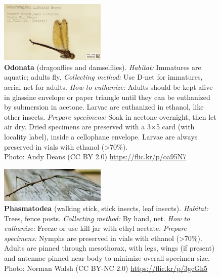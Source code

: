 \documentclass[letterpaper, 11pt]{article}
\begin{document}
\clearpage

\begin{figure}
  \caption{\textbf{Odonata} (dragonflies and damselflies). \textit{Habitat:} Immatures are aquatic; adults fly. \textit{Collecting method:} Use D-net for immatures, aerial net for adults. \textit{How to euthanize:} Adults should be kept alive in glassine envelope or paper triangle until they can be euthanized by submersion in acetone. Larvae are euthanized in ethanol, like other insects. \textit{Prepare specimens:} Soak in acetone overnight, then let air dry. Dried specimens are preserved with a 3$\times$5 card (with locality label), inside a cellophane envelope. Larvae are always preserved in vials with ethanol (\textgreater70\%).\\ Photo: Andy Deans (CC BY 2.0) \url{https://flic.kr/p/oa95N7}}
  \includegraphics[width=0.45\textwidth]{Odonata}
\end{figure}

\begin{figure}
  \caption{\textbf{Phasmatodea} (walking stick, stick insects, leaf insects). \textit{Habitat:} Trees, fence posts. \textit{Collecting method:} By hand, net. \textit{How to euthanize:} Freeze or use kill jar with ethyl acetate. \textit{Prepare specimens:} Nymphs are preserved in vials with ethanol (\textgreater70\%). Adults are pinned through mesothorax, with legs, wings (if present) and antennae pinned near body to minimize overall specimen size. \\ Photo: Norman Walsh (CC BY-NC 2.0) \url{https://flic.kr/p/3gcGh5}}
  \includegraphics[width=0.45\textwidth]{Phasmatodea}
\end{figure}
\end{document}
